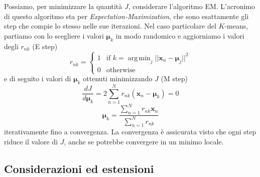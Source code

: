 \documentclass{report}
\DeclareMathOperator*{\argmin}{arg\,min}
\begin{document}
Possiamo, per minimizzare la quantità $J$, considerare l'algoritmo EM. L'acronimo di questo algoritmo sta per \textit{Expectation-Maximization}, che sono esattamente gli step che compie lo stesso nelle sue iterazioni. Nel caso particolare del $K$-means, partiamo con lo scegliere i valori $\bm\mu_k$ in modo randomico e aggiorniamo i valori degli $r_{nk}$ (E step)
\begin{equation}
r_{nk} = 
  \begin{cases}
    1 & \text{if $k = \argmin_j||\bm{x}_n - \bm\mu_j||^2$} \\
    0 & \text{otherwise}
  \end{cases}
\end{equation}
e di seguito i valori di $\bm\mu_k$ ottenuti minimizzando $J$ (M step)
\begin{equation}
\frac{dJ}{d\bm\mu_k} = 2\sum_{n=1}^{N}r_{nk}(\bm{x}_n - \bm\mu_k) = 0
\end{equation}
\begin{equation}
\bm\mu_k = \frac{\sum_{n=1}^{N}r_{nk}\bm{x}_n}{\sum_{n=1}^{N}r_{nk}}
\end{equation}
iterativamente fino a convergenza. La convergenza è assicurata visto che ogni step riduce il valore di $J$, anche se potrebbe convergere in un minimo locale.

\subsection{Considerazioni ed estensioni}
\end{document}
